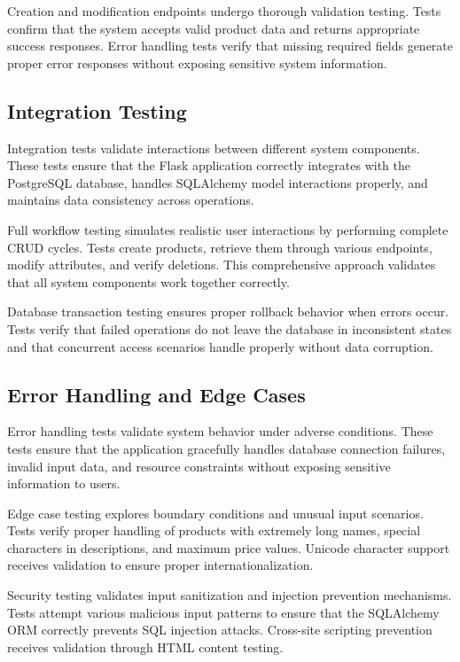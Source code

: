\documentclass[12pt,a4paper]{article}
\begin{document}
Creation and modification endpoints undergo thorough validation testing. Tests confirm that the system accepts valid product data and returns appropriate success responses. Error handling tests verify that missing required fields generate proper error responses without exposing sensitive system information.

\subsection{Integration Testing}

Integration tests validate interactions between different system components. These tests ensure that the Flask application correctly integrates with the PostgreSQL database, handles SQLAlchemy model interactions properly, and maintains data consistency across operations.

Full workflow testing simulates realistic user interactions by performing complete CRUD cycles. Tests create products, retrieve them through various endpoints, modify attributes, and verify deletions. This comprehensive approach validates that all system components work together correctly.

Database transaction testing ensures proper rollback behavior when errors occur. Tests verify that failed operations do not leave the database in inconsistent states and that concurrent access scenarios handle properly without data corruption.

\subsection{Error Handling and Edge Cases}

Error handling tests validate system behavior under adverse conditions. These tests ensure that the application gracefully handles database connection failures, invalid input data, and resource constraints without exposing sensitive information to users.

Edge case testing explores boundary conditions and unusual input scenarios. Tests verify proper handling of products with extremely long names, special characters in descriptions, and maximum price values. Unicode character support receives validation to ensure proper internationalization.

Security testing validates input sanitization and injection prevention mechanisms. Tests attempt various malicious input patterns to ensure that the SQLAlchemy ORM correctly prevents SQL injection attacks. Cross-site scripting prevention receives validation through HTML content testing.
\end{document}
